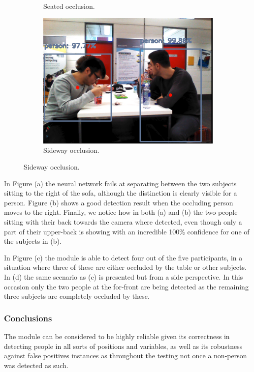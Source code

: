 \begin{figure}[H]
\begin{subfigure}{.5\textwidth}
        \caption{Seated occlusion.}
	\end{subfigure}
    \begin{subfigure}{.5\textwidth}
        \centering
        \includegraphics[width=.9\linewidth]{images/chapter6_occlusion_table_side.png}
        \caption{Sideway occlusion.}
	\end{subfigure}
\end{figure}

In Figure (a) the neural network fails at separating between the two subjects sitting to the right of the sofa, although the distinction is clearly visible for a person. Figure (b) shows a good detection result when the occluding person moves to the right. Finally, we notice how in both (a) and (b) the two people sitting with their back towards the camera where detected, even though only a part of their upper-back is showing with an incredible 100\% confidence for one of the subjects in (b).

In Figure (c) the module is able to detect four out of the five participants, in a situation where three of these are either occluded by the table or other subjects. In (d) the same scenario as (c) is presented but from a side perspective. In this occasion only the two people at the for-front are being detected as the remaining three subjects are completely occluded by these.

\subsubsection{Conclusions}

The module can be considered to be highly reliable given its correctness in detecting people in all sorts of positions and variables, as well as its robustness against false positives instances as throughout the testing not once a non-person was detected as such.


